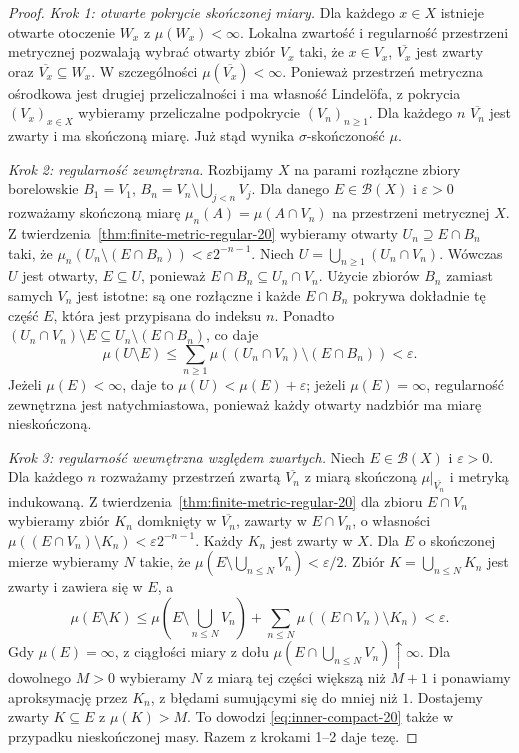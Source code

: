 \begin{proof}
\emph{Krok 1: otwarte pokrycie skończonej miary.}
Dla każdego $x\in X$ istnieje otwarte otoczenie $W_x$
z $\mu(W_x)<\infty$. Lokalna zwartość i regularność
przestrzeni metrycznej pozwalają wybrać otwarty zbiór
$V_x$ taki, że $x\in V_x$, $\overline{V_x}$ jest zwarty
oraz $\overline{V_x}\subseteq W_x$.
W szczególności $\mu(\overline{V_x})<\infty$.
Ponieważ przestrzeń metryczna ośrodkowa jest drugiej
przeliczalności i ma własność Lindelöfa,
z pokrycia $(V_x)_{x\in X}$ wybieramy przeliczalne
podpokrycie $(V_n)_{n\ge1}$. Dla każdego $n$
$\overline{V_n}$ jest zwarty i ma skończoną miarę.
Już stąd wynika $\sigma$-skończoność $\mu$.

\emph{Krok 2: regularność zewnętrzna.}
Rozbijamy $X$ na parami rozłączne zbiory borelowskie
$B_1=V_1$, $B_n=V_n\setminus\bigcup_{j<n}V_j$.
Dla danego $E\in\mathcal B(X)$ i $\varepsilon>0$
rozważamy skończoną miarę
$\mu_n(A)=\mu(A\cap V_n)$ na przestrzeni metrycznej $X$.
Z twierdzenia~\ref{thm:finite-metric-regular-20}
wybieramy otwarty $U_n\supseteq E\cap B_n$ taki, że
$\mu_n(U_n\setminus(E\cap B_n))<\varepsilon2^{-n-1}$.
Niech $U=\bigcup_{n\ge1}(U_n\cap V_n)$.
Wówczas $U$ jest otwarty, $E\subseteq U$, ponieważ
$E\cap B_n\subseteq U_n\cap V_n$. Użycie zbiorów
$B_n$ zamiast samych $V_n$ jest istotne: są one
rozłączne i każde $E\cap B_n$ pokrywa dokładnie tę
część $E$, która jest przypisana do indeksu $n$.
Ponadto $(U_n\cap V_n)\setminus E\subseteq
U_n\setminus(E\cap B_n)$, co daje
\[
\mu(U\setminus E)
\le\sum_{n\ge1}\mu((U_n\cap V_n)\setminus(E\cap B_n))
<\varepsilon.
\]
Jeżeli $\mu(E)<\infty$, daje to
$\mu(U)<\mu(E)+\varepsilon$; jeżeli $\mu(E)=\infty$,
regularność zewnętrzna jest natychmiastowa,
ponieważ każdy otwarty nadzbiór ma miarę nieskończoną.

\emph{Krok 3: regularność wewnętrzna względem zwartych.}
Niech $E\in\mathcal B(X)$ i $\varepsilon>0$.
Dla każdego $n$ rozważamy przestrzeń zwartą
$\overline{V_n}$ z miarą skończoną
$\mu|_{\overline{V_n}}$ i metryką indukowaną.
Z twierdzenia~\ref{thm:finite-metric-regular-20}
dla zbioru $E\cap V_n$ wybieramy zbiór
$K_n$ domknięty w $\overline{V_n}$, zawarty w
$E\cap V_n$, o własności
$\mu((E\cap V_n)\setminus K_n)<\varepsilon2^{-n-1}$.
Każdy $K_n$ jest zwarty w $X$.
Dla $E$ o skończonej mierze wybieramy $N$ takie, że
$\mu(E\setminus\bigcup_{n\le N}V_n)<\varepsilon/2$.
Zbiór $K=\bigcup_{n\le N}K_n$ jest zwarty i zawiera się
w $E$, a
\[
 \mu(E\setminus K)
 \le\mu(E\setminus\bigcup_{n\le N}V_n)
 +\sum_{n\le N}\mu((E\cap V_n)\setminus K_n)
 <\varepsilon.
\]
Gdy $\mu(E)=\infty$, z ciągłości miary z dołu
$\mu(E\cap\bigcup_{n\le N}V_n)\uparrow\infty$.
Dla dowolnego $M>0$ wybieramy $N$ z miarą tej części
większą niż $M+1$ i ponawiamy aproksymację przez
$K_n$, z błędami sumującymi się do mniej niż $1$.
Dostajemy zwarty $K\subseteq E$ z $\mu(K)>M$.
To dowodzi \eqref{eq:inner-compact-20} także w przypadku
nieskończonej masy. Razem z krokami 1--2 daje tezę.
\end{proof}

